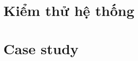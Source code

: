 \section{Kiểm thử hệ thống}

\section{Case study}

% 

%     
%     
%     
%     
%     
%     
%     
%     
%     
%     

%     
%     

%     
%     
%     
%     
%     
%     

